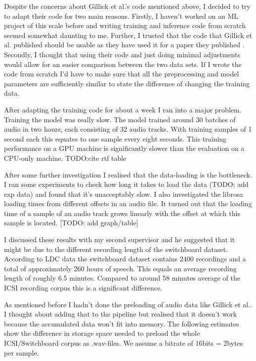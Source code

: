 \documentclass[bsc,frontabs,parskip,deptreport]{infthesis}
\begin{document}
Despite the concerns about Gillick et al.'s code mentioned above, I decided to try to adapt their code for two main reasons. 
Firstly, I haven't worked on an ML project of this scale before and writing training and inference code from scratch seemed somewhat daunting to me. Further, I trusted that the code that Gillick et al. published should be usable as they have used it for a paper they published \citep{gillick2021robust}. 
Secondly, I thought that using their code and just doing minimal adjustments would allow for an easier comparison between the two data sets. If I wrote the code from scratch I'd have to make sure that all the preprocessing and model parameters are sufficiently similar to state the difference of changing the training data. 

After adapting the training code for about a week I ran into a major problem. Training the model was really slow. The model trained around 30 batches of audio in two hours, each consisting of 32 audio tracks. 
With training samples of 1 second each this equates to one sample every eight seconds.
This training performance on a GPU machine is significantly slower than the evaluation on a CPU-only machine. TODO:cite rtf table

After some further investigation I realised that the data-loading is the bottleneck. I ran some experiments to check how long it takes to load the data (TODO: add exp data) and found that it's unacceptably slow. 
I also investigated the librosa loading times from different offsets in an audio file. It turned out that the loading time of a sample of an audio track grows linearly with the offset at which this sample is located. [TODO: add graph/table]

I discussed these results with my second supervisor and he suggested that it might be due to the different recording length of the switchboard dataset. According to LDC data \citep{switchboard-ldc} the switchboard dataset contains 2400 recordings and a total of approximately 260 hours of speech. This equals an average recording length of roughly 6.5 minutes. Compared to around 58 minutes average \citep{icsi-ldc} of the ICSI recording corpus this is a significant difference.


As mentioned before I hadn't done the preloading of audio data like Gillick et al.. 
I thought about adding that to the pipeline but realised that it doesn't work because the accumulated data won't fit into memory. 
The following estimates show the difference in storage space needed to preload the whole ICSI/Switchboard corpus as .wav-files. We assume a bitrate of 16bits = 2bytes per sample.
\end{document}
